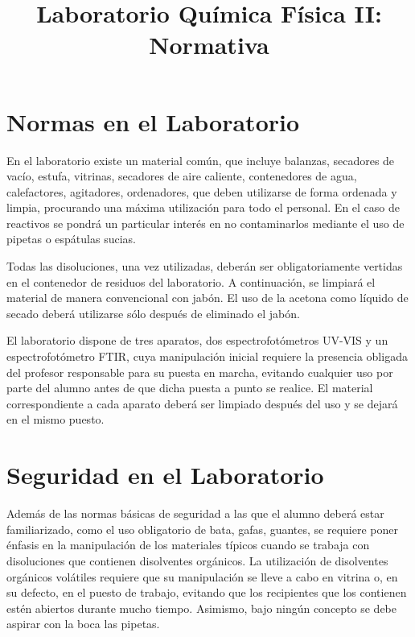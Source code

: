 \documentclass{tufte-handout}
\title[Prácticas Química Física II: Normativa]{
Laboratorio Química Física II: Normativa}
\date{}  %
\begin{document}
\maketitle%


\section{Normas en el Laboratorio}
En el laboratorio existe un material común, que incluye balanzas, secadores de vacío,
estufa, vitrinas, secadores de aire caliente, contenedores de agua, calefactores,
agitadores, ordenadores, que deben utilizarse de forma ordenada y limpia, procurando
una máxima utilización para todo el personal. En el caso de reactivos se pondrá un particular
interés en no contaminarlos mediante el uso de pipetas o espátulas sucias.

Todas las disoluciones, una vez utilizadas, deberán ser obligatoriamente vertidas en el
contenedor de residuos del laboratorio. A continuación, se limpiará el material
de manera convencional con jabón. El uso de la acetona como líquido de secado
deberá utilizarse sólo después de eliminado el jabón.

El laboratorio dispone de tres aparatos, dos espectrofotómetros UV-VIS y un espectrofotómetro FTIR,
cuya manipulación inicial requiere la presencia obligada del profesor responsable para su puesta en
marcha, evitando cualquier uso por parte del alumno antes de que
dicha puesta a punto se realice. El material correspondiente a cada aparato deberá ser
limpiado después del uso y se dejará en el mismo puesto.

\section{Seguridad en el Laboratorio}
Además de las normas básicas de seguridad a las que el alumno deberá estar familiarizado,
como el uso obligatorio de bata, gafas, guantes, se requiere poner énfasis en la
manipulación de los materiales típicos cuando se trabaja con disoluciones que contienen
disolventes orgánicos.
La utilización de disolventes orgánicos volátiles requiere que su manipulación se lleve a cabo
en vitrina o, en su defecto, en el puesto de trabajo, evitando que los recipientes que los
contienen estén abiertos durante mucho tiempo. Asimismo, bajo ningún concepto se debe
aspirar con la boca las pipetas.
\end{document}
